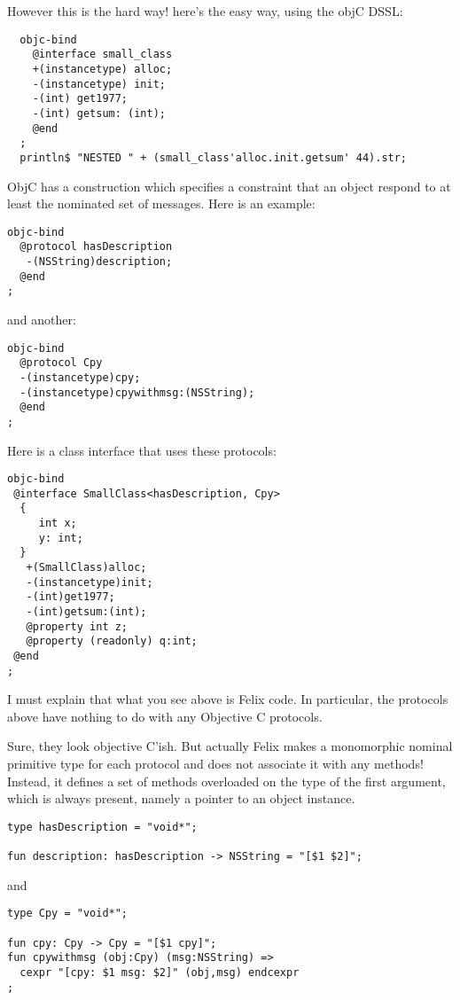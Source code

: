 \documentclass[oneside]{book}
\begin{document}
However this is the hard way! here's the easy way, using the
objC DSSL:

\begin{verbatim}
  objc-bind 
    @interface small_class 
    +(instancetype) alloc;
    -(instancetype) init;
    -(int) get1977;
    -(int) getsum: (int);
    @end
  ;
  println$ "NESTED " + (small_class'alloc.init.getsum' 44).str; 
\end{verbatim}

ObjC has a construction which specifies a constraint that an object 
respond to at least the nominated set of messages. Here is an example:

\begin{verbatim}
objc-bind 
  @protocol hasDescription
   -(NSString)description;
  @end
;
\end{verbatim}

and another:

\begin{verbatim}
objc-bind
  @protocol Cpy
  -(instancetype)cpy;
  -(instancetype)cpywithmsg:(NSString);
  @end
;
\end{verbatim}

Here is a class interface that uses these protocols:

\begin{verbatim}
objc-bind 
 @interface SmallClass<hasDescription, Cpy>
  {
     int x;
     y: int;
  }
   +(SmallClass)alloc;
   -(instancetype)init;
   -(int)get1977;
   -(int)getsum:(int);
   @property int z;
   @property (readonly) q:int;
 @end
;
\end{verbatim}

I must explain that what you see above is Felix code. In particular,
the protocols above have nothing to do with any Objective C protocols. 

Sure, they look objective C'ish. But actually Felix makes a 
monomorphic nominal primitive type for each protocol and does not
associate it with any methods! Instead, it defines a set of methods
overloaded on the type of the first argument, which is always present,
namely a pointer to an object instance.

\begin{verbatim}
type hasDescription = "void*";

fun description: hasDescription -> NSString = "[$1 $2]";
\end{verbatim}

and

\begin{verbatim}
type Cpy = "void*";

fun cpy: Cpy -> Cpy = "[$1 cpy]";
fun cpywithmsg (obj:Cpy) (msg:NSString) => 
  cexpr "[cpy: $1 msg: $2]" (obj,msg) endcexpr
; 
\end{verbatim}
\end{document}
